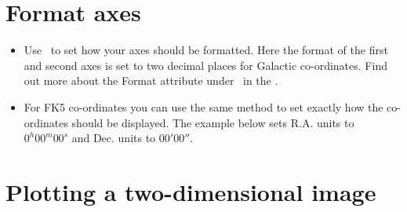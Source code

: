 \documentclass[11pt,oneside,chapters]{starlink}
\providecommand{\att}[1]{\textsf{#1}}
\begin{document}
\section{Format axes}
\begin{itemize}
\item Use \wcsattrib\ to set how your axes should be formatted. Here
the format of the first and second axes is set to two decimal places
for Galactic co-ordinates. Find out more about the \att{Format} attribute
under \wcsattrib\ in the .
\begin{terminalv}
\end{terminalv}

\item For FK5 co-ordinates you can use the same method to set exactly
how the co-ordinates should be displayed. The example below sets R.A.
units to $0^h00^m00^s$ and Dec. units to $00'00''$.
\begin{terminalv}
\end{terminalv}
\end{itemize}

\newpage

\section{Plotting a two-dimensional image}
\end{document}
